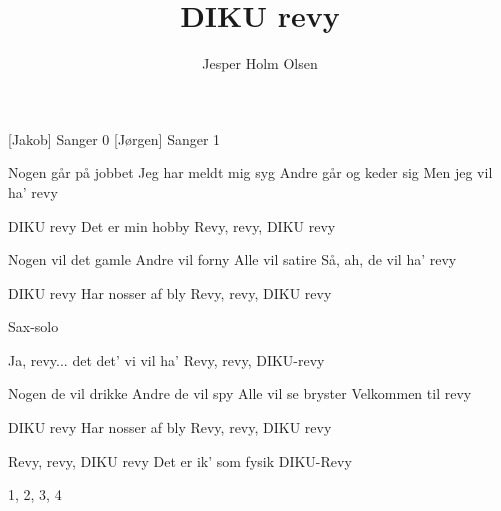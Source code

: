 \documentclass[a4paper,11pt]{article}
\title{DIKU revy}
\author{Jesper Holm Olsen}
\begin{document}
\maketitle

\begin{roles}   
  [Jakob] Sanger 0
  [Jørgen] Sanger 1
\end{roles}

\begin{song}
  
  Nogen går på jobbet
  Jeg har meldt mig syg
  Andre går og keder sig
  Men jeg vil ha' revy
  
  DIKU revy
  Det er min hobby
  Revy, revy, DIKU revy
  
  Nogen vil det gamle
  Andre vil forny
  Alle vil satire
  Så, ah, de vil ha' revy
  
  DIKU revy
  Har nosser af bly
  Revy, revy, DIKU revy
  
  \scene Sax-solo
  
  Ja, revy... 
  det det' vi vil ha'
  Revy, revy, DIKU-revy
  

  Nogen de vil drikke
  Andre de vil spy
  Alle vil se bryster
  Velkommen til revy

  DIKU revy
  Har nosser af bly
  Revy, revy, DIKU revy
  
  Revy, revy, DIKU revy
  Det er ik'
  som fysik
  DIKU-Revy
  
  1, 2, 3, 4


\end{song}
\end{document}

